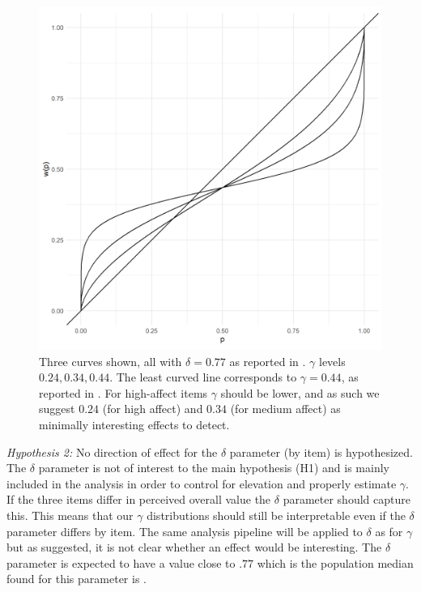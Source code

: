 \documentclass[12pt]{article}
\begin{document}
\begin{figure}[h!]
	\includegraphics[width = \linewidth]
	{../Figures/ourHyp.png}
	Three curves shown, all with $\delta = 0.77$
	as reported in \textcite{gonzalez1999shape}.
	$\gamma$ levels $0.24, 0.34, 0.44$. The
	least curved line corresponds to $\gamma = 0.44$,
	as reported in \textcite{gonzalez1999shape}.
	For high-affect items $\gamma$ should
	be lower, and as such we suggest $0.24$
	(for high affect) and  $0.34$ (for medium
	affect) as minimally interesting effects
	to detect.
\end{figure}

\emph{Hypothesis 2:} No direction of effect
for the $\delta$ parameter (by item) is
hypothesized. The  $\delta$ parameter is
not of interest to the main hypothesis (H1)
and is mainly included in the analysis in
order to control for elevation and properly
estimate  $\gamma$. If the three items differ
in perceived overall value the $\delta$ parameter
should capture this. This means that our $\gamma$
distributions should still be interpretable
even if the $\delta$ parameter differs by
item. The same analysis pipeline will be applied
to $\delta$ as for $\gamma$ but as suggested,
it is not clear whether an effect would
be interesting. The $\delta$ parameter is
expected to have a value close to $.77$
which is the population median found for
this parameter is \textcite{gonzalez1999shape}.
\end{document}
